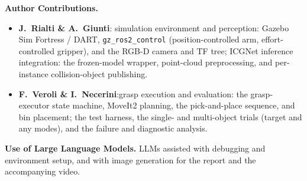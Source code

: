 \documentclass[10pt,twocolumn,letterpaper]{article}
\begin{document}
\noindent\textbf{Author Contributions.}
\begin{itemize}[noitemsep, topsep=2pt, leftmargin=*]
  \item \textbf{J.\ Rialti \& A.\ Giunti}: simulation environment and perception:
        Gazebo Sim Fortress / DART, \texttt{gz\_ros2\_control} (position-controlled arm,
        effort-controlled gripper), and the RGB-D camera and TF tree; ICGNet inference integration:
        the frozen-model wrapper, point-cloud preprocessing, and per-instance collision-object publishing.
  \item \textbf{F.\ Veroli \& I.\ Necerini}:grasp execution and evaluation: the grasp-executor
        state machine, MoveIt2 planning, the pick-and-place sequence, and bin placement; the test
        harness, the single- and multi-object trials (target and any modes), and the failure and
        diagnostic analysis.
\end{itemize}

\smallskip
\noindent\textbf{Use of Large Language Models.}
LLMs assisted with debugging and environment setup, and with image generation for the report and the accompanying video.

{\small


}
\end{document}
